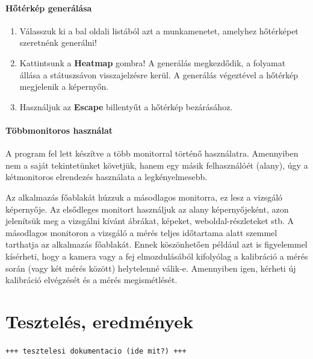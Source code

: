 \paragraph{Hőtérkép generálása}

\begin{enumerate}
  \item Válasszuk ki a bal oldali listából azt a munkamenetet, amelyhez hőtérképet szeretnénk generálni!
  \item Kattintsunk a \textbf{Heatmap} gombra! A generálás megkezdődik, a folyamat állása a státuszsávon visszajelzésre kerül. A generálás végeztével a hőtérkép megjelenik a képernyőn.
  \item Használjuk az \textbf{Escape} billentyűt a hőtérkép bezárásához.
\end{enumerate}

\paragraph{Többmonitoros használat}

A program fel lett készítve a több monitorral történő használatra. Amennyiben nem a saját tekintetünket követjük, hanem egy másik felhasználóét (alany), úgy a kétmonitoros elrendezés használata a legkényelmesebb.

Az alkalmazás főablakát húzzuk a másodlagos monitorra, ez lesz a vizsgáló képernyője. Az elsődleges monitort használjuk az alany képernyőjeként, azon jelenítsük meg a vizsgálni kívánt ábrákat, képeket, weboldal-részleteket stb. A másodlagos monitoron a vizsgáló a mérés teljes időtartama alatt szemmel tarthatja az alkalmazás főablakát. Ennek köszönhetően például azt is figyelemmel kísérheti, hogy a kamera vagy a fej elmozdulásából kifolyólag a kalibráció a mérés során (vagy két mérés között) helytelenné válik-e. Amennyiben igen, kérheti új kalibráció elvégzését és a mérés megismétlését.

\section{Tesztelés, eredmények}\label{sect:teszteles}

\texttt{+++ tesztelesi dokumentacio (ide mit?) +++}